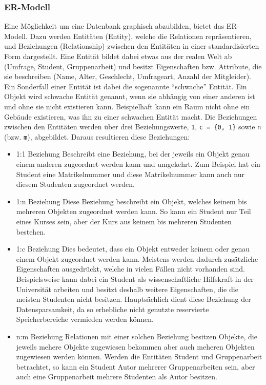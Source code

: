 \subsubsection{\acl{ER-Modell}}
Eine Möglichkeit um eine Datenbank graphisch abzubilden, bietet das \ac{ER-Modell}.
Dazu werden Entitäten (Entity), welche die Relationen repräsentieren, und Beziehungen (Relationship) zwischen den Entitäten in einer standardisierten Form dargestellt.
Eine Entität bildet dabei etwas aus der realen Welt ab (Umfrage, Student, Gruppenarbeit) und besitzt Eigenschaften bzw. Attribute, die sie beschreiben (Name, Alter, Geschlecht, Umfrageart, Anzahl der Mitgleider).
Ein Sonderfall einer Entität ist dabei die sogenannte \enquote{schwache} Entität.
Ein Objekt wird schwache Entität genannt, wenn sie abhängig von einer anderen ist und ohne sie nicht existieren kann.
Beispielhaft kann ein Raum nicht ohne ein Gebäude existieren, was ihn zu einer schwachen Entität macht. 
Die Beziehungen zwischen den Entitäten werden über drei Beziehungswerte, \texttt{1}, \texttt{c = \{0, 1\}} sowie \texttt{n} (bzw. \texttt{m}), abgebildet.
Daraus resultieren diese Beziehungen:

\begin{itemize}
    \item 1:1 Beziehung \newline
    Beschreibt eine Beziehung, bei der jeweils ein Objekt genau einem anderen zugeordnet werden kann und umgekehrt.
    Zum Beispiel hat ein Student eine Matrikelnummer und diese Matrikelnummer kann auch nur diesem Studenten zugeordnet werden.
    \item 1:n Beziehung \newline
    Diese Beziehung beschreibt ein Objekt, welches keinem bis mehreren Objekten zugeordnet werden kann.
    So kann ein Student nur Teil eines Kurses sein, aber der Kurs aus keinem bis mehreren Studenten bestehen.
    \item 1:c Beziehung \newline
    Dies bedeutet, dass ein Objekt entweder keinem oder genau einem Objekt zugeordnet werden kann.
    Meistens werden dadurch zusätzliche Eigenschaften ausgedrückt, welche in vielen Fällen nicht vorhanden sind.
	Beispielsweise kann dabei ein Student als wissenschaftliche Hilfskraft in der Universität arbeiten und besitzt deshalb weitere Eigenschaften, die die meisten Studenten nicht besitzen.
	Hauptsächlich dient diese Beziehung der Datensparsamkeit, da so erhebliche nicht genutzte reservierte Speicherbereiche vermieden werden können.
    \item n:m Beziehung \newline
    Relationen mit einer solchen Beziehung besitzen Objekte, die jeweils mehere Objekte zugewiesen bekommen aber auch meheren Objekten zugewiesen werden können.
    Werden die Entitäten Student und Gruppenarbeit betrachtet, so kann ein Student Autor mehrerer Gruppenarbeiten sein, aber auch eine Gruppenarbeit mehrere Studenten als Autor besitzen.
\end{itemize}

